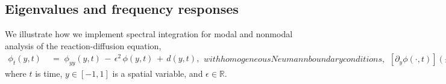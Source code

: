\documentclass[%
secnumarabic,%
 amssymb, amsmath,%
 aps,prf,superscriptaddress,longbibliography
frontmatterverbose,
]{revtex4-2}
\begin{document}

\subsection{Eigenvalues and frequency responses}
We illustrate how we implement spectral integration for modal and nonmodal analysis of the reaction-diffusion equation,
\begin{subequations}\label{eq:rndTrans}
\begin{align}
\phi_{t}(y,t) \;&=\;  \phi_{yy}(y,t)  \,-\, \epsilon^2\,\phi (y,t) \, + \, d(y,t),\label{eq:0}
\end{align}
with homogeneous Neumann boundary conditions,
\begin{align}
[\partial_y \phi (\cdot, t)](\pm 1) \;& =\; 0, \label{eq:0bc}
\end{align}
\end{subequations}
where $t$ is time, $y \in \left[ -1, 1 \right]$ is a spatial variable, and $ \epsilon \in \mathbb{R}$. 
\end{document}
